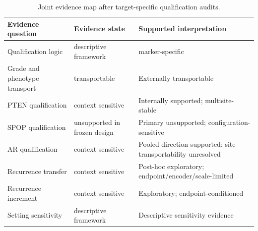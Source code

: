 \begin{table}[htbp]
\centering
\small
\caption{Joint evidence map after target-specific qualification audits.}
\label{tab:qualification-summary}
\begin{tabular}{@{}p{}p{}p{}@{}}
\toprule
Evidence question & Evidence state & Supported interpretation \\
\midrule
Qualification logic & descriptive framework & marker-specific \\
Grade and phenotype transport & transportable & Externally transportable \\
PTEN qualification & context sensitive & Internally supported; multisite-stable \\
SPOP qualification & unsupported in frozen design & Primary unsupported; configuration-sensitive \\
AR qualification & context sensitive & Pooled direction supported; site transportability unresolved \\
Recurrence transfer & context sensitive & Post-hoc exploratory; endpoint/encoder/scale-limited \\
Recurrence increment & context sensitive & Exploratory; endpoint-conditioned \\
Setting sensitivity & descriptive framework & Descriptive sensitivity evidence \\
\bottomrule
\end{tabular}
\end{table}
